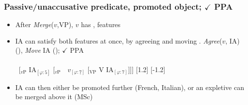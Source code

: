 \documentclass[letterpaper,10pt]{handout_nick}
\begin{document}
\subsubsection{Passive/unaccusative predicate, promoted object; $\checkmark$ PPA }
\begin{itemize}
\item After \emph{Merge}($v$,VP), $v$ has \fm{$\varphi$}, \fa{$\varphi$} features 
\item IA can satisfy both features at once, by agreeing and moving
\ex. \emph{Agree}($v$, IA) (\fas{$\varphi$}), \emph{Move} IA (\fms{$\varphi$}); $\checkmark$ PPA\\\\
\ [$_\text{$v$P}$ \hspace*{-.3cm}IA$_{[\varphi:5]}$ [$_\text{$v$P}$\ \ \hspace*{-.2cm}\hspace*{-.2cm}$v_{[\varphi:\underline{7}]}$ [$_\text{VP}$ V \hspace*{-.3cm}IA$_{[\varphi:7]}$]]]
[1.2]
[-1.2]\\

\item IA can then either be promoted further (French, Italian), or an expletive can be merged above it (MSc)
\end{itemize}
\end{document}
